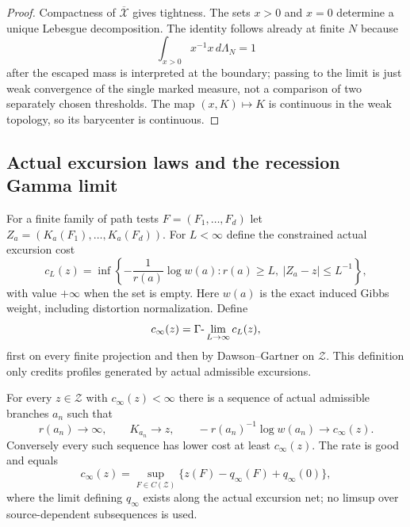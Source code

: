 \begin{proof}
Compactness of $\overline{\mathcal X}$ gives tightness.  The sets $x>0$ and
$x=0$ determine a unique Lebesgue decomposition.  The identity follows
already at finite $N$ because
\[
 \int_{x>0}x^{-1}x\,d\Lambda_N=1
\]
after the escaped mass is interpreted at the boundary; passing to the limit is
just weak convergence of the single marked measure, not a comparison of two
separately chosen thresholds.  The map $(x,K)\mapsto K$ is continuous in the
weak topology, so its barycenter is continuous.
\end{proof}

\subsection{Actual excursion laws and the recession Gamma limit}

For a finite family of path tests $F=(F_1,\ldots,F_d)$ let
$Z_a=(K_a(F_1),\ldots,K_a(F_d))$.  For $L<\infty$ define the constrained
actual excursion cost
\[
 c_L(z)=\inf\left\{-\frac1{r(a)}\log w(a):
 r(a)\ge L,\ |Z_a-z|\le L^{-1}\right\},
\]
with value $+\infty$ when the set is empty.  Here $w(a)$ is the exact induced
Gibbs weight, including distortion normalization.  Define
\[
 c_\infty(z)=\Gamma\hbox{-}\lim_{L\to\infty}c_L(z),
\]
first on every finite projection and then by Dawson--Gartner on $\mathcal Z$.
This definition only credits profiles generated by actual admissible
excursions.

\begin{theorem}
\label{thm:r7-a3-excursion}
For every $z\in\mathcal Z$ with $c_\infty(z)<\infty$ there is a sequence of
actual admissible branches $a_n$ such that
\[
 r(a_n)\to\infty,
 \qquad K_{a_n}\to z,
 \qquad -r(a_n)^{-1}\log w(a_n)\to c_\infty(z).
\]
Conversely every such sequence has lower cost at least $c_\infty(z)$.  The
rate is good and equals
\[
 c_\infty(z)=\sup_{F\in C(\mathcal Z)}
 \{z(F)-q_\infty(F)+q_\infty(0)\},
\]
where the limit defining $q_\infty$ exists along the actual excursion net; no
limsup over source-dependent subsequences is used.
\end{theorem}

